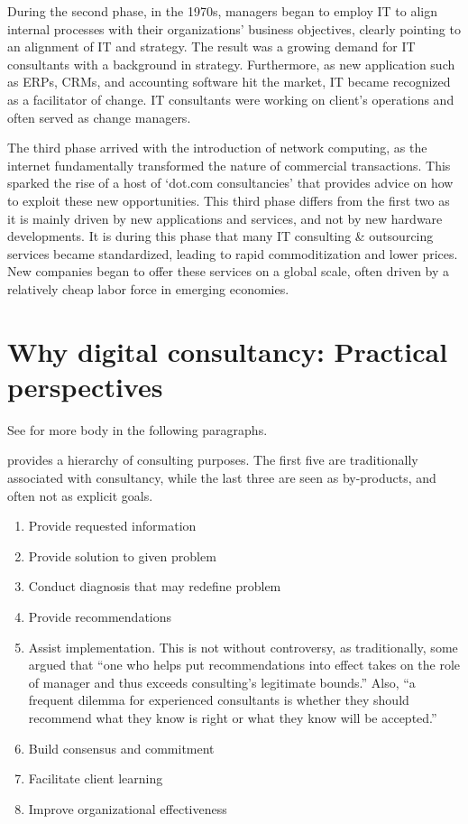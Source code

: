 \documentclass[12pt]{article}
\providecommand{\tightlist}{%
  \setlength{\itemsep}{0pt}\setlength{\parskip}{0pt}}
\begin{document}
During the second phase, in the 1970s, managers began to employ IT to
align internal processes with their organizations' business objectives,
clearly pointing to an alignment of IT and strategy. The result was a
growing demand for IT consultants with a background in strategy.
Furthermore, as new application such as ERPs, CRMs, and accounting
software hit the market, IT became recognized as a facilitator of
change. IT consultants were working on client's operations and often
served as change managers.

The third phase arrived with the introduction of network computing, as
the internet fundamentally transformed the nature of commercial
transactions. This sparked the rise of a host of `dot.com consultancies'
that provides advice on how to exploit these new opportunities. This
third phase differs from the first two as it is mainly driven by new
applications and services, and not by new hardware developments. It is
during this phase that many IT consulting \& outsourcing services became
standardized, leading to rapid commoditization and lower prices. New
companies began to offer these services on a global scale, often driven
by a relatively cheap labor force in emerging economies.

\hypertarget{why-digital-consultancy-practical-perspectives}{%
\section{Why digital consultancy: Practical
perspectives}\label{why-digital-consultancy-practical-perspectives}}

See \citet{lacity1994} for more body in the following paragraphs.

\citet{turner1982} provides a hierarchy of consulting purposes. The
first five are traditionally associated with consultancy, while the last
three are seen as by-products, and often not as explicit goals.

\begin{enumerate}
\def\labelenumi{\arabic{enumi}.}
\tightlist
\item
  Provide requested information
\item
  Provide solution to given problem
\item
  Conduct diagnosis that may redefine problem
\item
  Provide recommendations
\item
  Assist implementation. This is not without controversy, as
  traditionally, some argued that ``one who helps put recommendations
  into effect takes on the role of manager and thus exceeds consulting's
  legitimate bounds.'' Also, ``a frequent dilemma for experienced
  consultants is whether they should recommend what they know is right
  or what they know will be accepted.''
\item
  Build consensus and commitment
\item
  Facilitate client learning
\item
  Improve organizational effectiveness
\end{enumerate}
\end{document}

